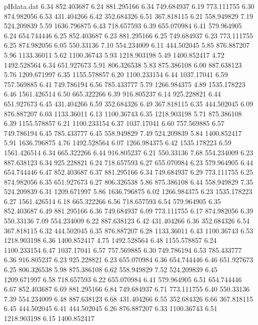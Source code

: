 \begin{filecontents}{pHdata.dat}
6.34 	852.403687
6.24 	881.295166
6.34 	749.684937
6.19 	773.111755
6.30 	874.982056
6.53 	431.404266
6.42 	352.684326
6.51 	367.818115
6.21 	558.949829
7.19 	524.209839
5.59 	1636.796875
6.43 	718.657593
6.39 	655.070984
6.41 	579.964905
6.24 	654.744446
6.25 	852.403687
6.23 	881.295166
6.25 	749.684937
6.23 	773.111755
6.25 	874.982056
6.05 	550.33136
7.10 	554.234009
6.11 	444.502045
5.85 	876.887207
5.96 	1133.36011
5.62 	1100.36743
5.93 	1218.903198
5.49 	1400.852417
4.72 	1492.528564
6.34 	651.927673
5.91 	806.326538
5.83 	875.386108
6.00 	887.638123
5.76 	1209.671997
6.35 	1155.578857
6.20 	1100.233154
6.44 	1037.17041
6.59 	757.569885
6.41 	749.786194
6.56 	785.433777
5.79 	1266.984375
4.89 	1535.178223
6.46 	1561.426514
6.50 	665.322266
6.39 	916.805237
6.14 	925.228821
6.44 	651.927673
6.45 	431.404266
6.59 	352.684326
6.49 	367.818115
6.35 	444.502045
6.09 	876.887207
6.03 	1133.36011
6.13 	1100.36743
6.35 	1218.903198
5.71 	875.386108
6.39 	1155.578857
6.21 	1100.233154
6.37 	1037.17041
6.60 	757.569885
6.57 	749.786194
6.45 	785.433777
6.45 	558.949829
7.49 	524.209839
5.84 	1400.852417
5.91 	1636.796875
4.76 	1492.528564
6.07 	1266.984375
6.42 	1535.178223
6.59 	1561.426514
6.34 	665.322266
6.44 	916.805237
6.21 	550.33136
7.68 	554.234009
6.23 	887.638123
6.34 	925.228821
6.24 	718.657593
6.27 	655.070984
6.23 	579.964905
6.44 	654.744446
6.47 	852.403687
6.37 	881.295166
6.34 	749.684937
6.29 	773.111755
6.25 	874.982056
6.35 	651.927673
6.27 	806.326538
5.86 	875.386108
6.44 	558.949829
7.35 	524.209839
6.31 	1209.671997
5.86 	1636.796875
6.02 	1266.984375
6.23 	1535.178223
6.27 	1561.426514
6.18 	665.322266
6.56 	718.657593
6.54 	579.964905
6.35 	852.403687
6.49 	881.295166
6.36 	749.684937
6.09 	773.111755
6.17 	874.982056
6.39 	550.33136
7.09 	554.234009
6.22 	887.638123
6.42 	431.404266
6.36 	352.684326
6.54 	367.818115
6.32 	444.502045
6.35 	876.887207
6.28 	1133.36011
6.43 	1100.36743
6.53 	1218.903198
6.36 	1400.852417
4.75 	1492.528564
6.48 	1155.578857
6.24 	1100.233154
6.47 	1037.17041
6.57 	757.569885
6.30 	749.786194
6.53 	785.433777
6.36 	916.805237
6.23 	925.228821
6.23 	655.070984
6.36 	654.744446
6.46 	651.927673
6.25 	806.326538
5.98 	875.386108
6.62 	558.949829
7.52 	524.209839
6.45 	1209.671997
6.58 	718.657593
6.22 	655.070984
6.41 	579.964905
6.51 	654.744446
6.67 	852.403687
6.69 	881.295166
6.84 	749.684937
6.71 	773.111755
6.40 	550.33136
7.39 	554.234009
6.48 	887.638123
6.68 	431.404266
6.55 	352.684326
6.66 	367.818115
6.45 	444.502045
6.41 	444.502045
6.26 	876.887207
6.33 	1100.36743
6.51 	1218.903198
6.15 	1400.852417

\end{filecontents}
